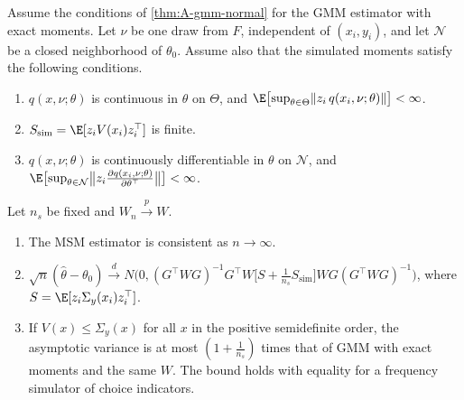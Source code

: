 \begin{proposition}\label{prop:A-msm}
Assume the conditions of \cref{thm:A-gmm-normal} for the GMM estimator with exact moments. Let $\nu$ be one draw from
$F$, independent of $(x_i, y_i)$, and let $\mathcal{N}$ be a closed neighborhood of $\theta_0$. Assume also that the
simulated moments satisfy the following conditions.
\begin{enumerate}[label=(\alph*)]
  \item $q(x, \nu;\theta)$ is continuous in $\theta$ on $\Theta$, and
  $\E\bigl[\sup_{\theta \in \Theta}\lVert z_i\,q(x_i, \nu;\theta)\rVert\bigr] < \infty$.
  \item $S_{\text{sim}} = \E[z_iV(x_i)z_i^\top]$ is finite.
  \item $q(x, \nu;\theta)$ is continuously differentiable in $\theta$ on $\mathcal{N}$, and
  $\E\bigl[\sup_{\theta \in \mathcal{N}}\bigl\lVert z_i\frac{\partial q(x_i, \nu;\theta)}{\partial\theta^\top}\bigr\rVert\bigr]
  < \infty$.
\end{enumerate}
Let $n_s$ be fixed and $W_n \xrightarrow{p} W$.
\begin{enumerate}[label=(\roman*)]
  \item The MSM estimator is consistent as $n \to \infty$.
  \item $\sqrt n(\hat\theta - \theta_0) \xrightarrow{d} N\bigl(0, (G^\top WG)^{-1}G^\top W\bigl[S + \tfrac{1}{n_s}S_{\text{sim}}\bigr]WG(G^\top WG)^{-1}\bigr)$,
  where $S = \E[z_i\Sigma_y(x_i)z_i^\top]$.
  \item If $V(x) \le \Sigma_y(x)$ for all $x$ in the positive semidefinite order, the asymptotic variance is at most
  $(1 + \frac{1}{n_s})$ times that of GMM with exact moments and the same $W$. The bound holds with equality for a
  frequency simulator of choice indicators.
\end{enumerate}
\end{proposition}

